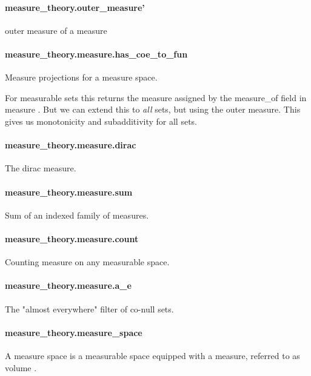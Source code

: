 \documentclass{article}
\begin{document}
\paragraph{measure\_theory.outer\_measure'}
\par
outer measure of a measure
\paragraph{measure\_theory.measure.has\_coe\_to\_fun}
\par
Measure projections for a measure space.
\par
For measurable sets this returns the measure assigned by the 
\colorbox[RGB]{253,246,227}{{{{\color[RGB]{101, 123, 131} measure\_of }}}} field in 
\colorbox[RGB]{253,246,227}{{{{\color[RGB]{101, 123, 131} measure }}}}.
But we can extend this to 
\emph{all
} sets, but using the outer measure. This gives us monotonicity and
subadditivity for all sets.
\paragraph{measure\_theory.measure.dirac}
\par
The dirac measure.
\paragraph{measure\_theory.measure.sum}
\par
Sum of an indexed family of measures.
\paragraph{measure\_theory.measure.count}
\par
Counting measure on any measurable space.
\paragraph{measure\_theory.measure.a\_e}
\par
The "almost everywhere" filter of co-null sets.
\paragraph{measure\_theory.measure\_space}
\par
A measure space is a measurable space equipped with a
measure, referred to as 
\colorbox[RGB]{253,246,227}{{{{\color[RGB]{101, 123, 131} volume }}}}.
\end{document}
